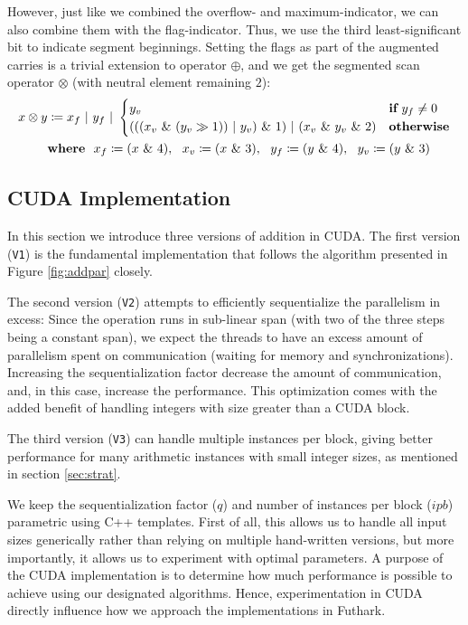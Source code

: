 However, just like we combined the overflow- and maximum-indicator, we can also
combine them with the flag-indicator. Thus, we use the third least-significant
bit to indicate segment beginnings. Setting the flags as part of the augmented
carries is a trivial extension to operator $\oplus$, and we get the segmented scan
operator $\otimes$ (with neutral element remaining $2$):
\begin{align}
  \label{eq:segscanop}
  x \otimes y &\coloneq x_f~|~y_f~|~\begin{cases} y_v & \textbf{if}~y_f \neq 0 \\ (((x_v~\&~(y_v \gg 1))~|~y_v)~\&~1)~|~(x_v~\&~y_v~\&~2) & \textbf{otherwise}\end{cases}\\
  & \textbf{where}~~x_f\coloneq (x~\&~4),~~x_v\coloneq (x~\&~3),~~y_f\coloneq (y~\&~4),~~y_v\coloneq (y~\&~3)\notag
\end{align}

\subsection{CUDA Implementation}
\label{subsec:addcud}

In this section we introduce three versions of addition in CUDA. The first
version (\texttt{V1}) is the fundamental implementation that follows the
algorithm presented in Figure \ref{fig:addpar} closely.

The second version (\texttt{V2}) attempts to efficiently sequentialize the
parallelism in excess: Since the operation runs in sub-linear span (with two of
the three steps being a constant span), we expect the threads to have an excess
amount of parallelism spent on communication (waiting for memory and
synchronizations). Increasing the sequentialization factor decrease the amount
of communication, and, in this case, increase the performance. This optimization
comes with the added benefit of handling integers with size greater than a CUDA
block.

The third version (\texttt{V3}) can handle multiple instances per block, giving
better performance for many arithmetic instances with small integer sizes, as
mentioned in section \ref{sec:strat}.

We keep the sequentialization factor ($q$) and number of instances per block
($\mathit{ipb}$) parametric using C++ templates. First of all, this allows us to
handle all input sizes generically rather than relying on multiple hand-written
versions, but more importantly, it allows us to experiment with optimal
parameters. A purpose of the CUDA implementation is to determine how much
performance is possible to achieve using our designated algorithms. Hence,
experimentation in CUDA directly influence how we approach the implementations in
Futhark.

